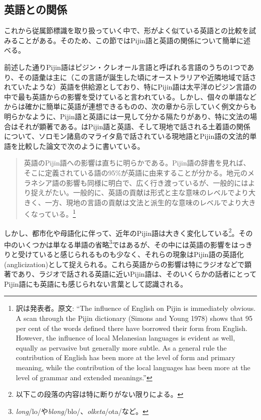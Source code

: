 \subsection{英語との関係}
これから従属節標識を取り扱っていく中で、形がよく似ている英語との比較を試みることがある。そのため、この節ではPijin語と英語の関係について簡単に述べる。

前述した通りPijin語はピジン・クレオール言語と呼ばれる言語のうちの1つであり、その語彙は主に（この言語が誕生した頃にオーストラリアや近隣地域で話されていたような）英語を供給源としており、特にPijin語は太平洋のピジン言語の中で最も英語からの影響を受けていると言われている\cite{nativization}。しかし、個々の単語などからは確かに簡単に英語が連想できるものの、次の章から示していく例文からも明らかなように、Pijin語と英語には一見して分かる隔たりがあり、特に文法の場合はそれが顕著である。\cite{malaitan}はPijin語と英語、そして現地で話される土着語の関係について、ソロモン諸島のマライタ島で話されている現地語とPijin語の文法的単語を比較した論文で次のように書いている。

\begin{quotation}
  英語のPijin語への影響は直ちに明らかである。Pijin語の辞書\citep{yumi}を見れば、そこに定義されている語の95\%が英語に由来することが分かる。地元のメラネシア語の影響も同様に明白で、広く行き渡っているが、一般的にはより捉えがたい。一般的に、英語の貢献は形式と主な意味のレベルでより大きく、一方、現地の言語の貢献は文法と派生的な意味のレベルでより大きくなっている。\citep{malaitan}\footnote{訳は発表者。原文: ``The influence of English on Pijin is immediately obvious. A scan through the Pijin dictionary (Simons and Young 1978) shows that 95 per cent of the words defined there have borrowed their form from English. However, the influence of local Melanesian languages is evident as well, equally as pervasive but generally more subtle. As a general rule the contribution of English has been more at the level of form and primary meaning, while the contribution of the local languages has been more at the level of grammar and extended meanings.''}
\end{quotation}

しかし、都市化や母語化に伴って、近年のPijin語は大きく変化している\footnote{以下この段落の内容は特に断りがない限り\cite{nativization}による。}。その中のいくつかは単なる単語の省略\footnote{\textit{long}/lo/や\textit{blong}/blo/、\textit{olketa}/ota/など。}ではあるが、その中には英語の影響をはっきりと受けていると感じられるものも少なく、それらの現象はPijin語の英語化(anglicization)として捉えられる。これら英語からの影響は特にラジオなどで顕著であり、ラジオで話される英語に近いPijin語は、そのいくらかの話者にとってPijin語にも英語にも感じられない言葉として認識される。

